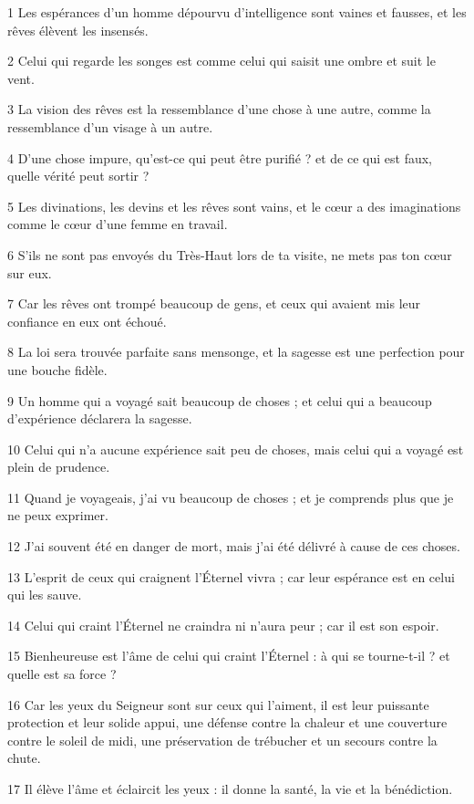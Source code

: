 
\par 1 Les espérances d'un homme dépourvu d'intelligence sont vaines et fausses, et les rêves élèvent les insensés.
\par 2 Celui qui regarde les songes est comme celui qui saisit une ombre et suit le vent.
\par 3 La vision des rêves est la ressemblance d'une chose à une autre, comme la ressemblance d'un visage à un autre.
\par 4 D'une chose impure, qu'est-ce qui peut être purifié ? et de ce qui est faux, quelle vérité peut sortir ?
\par 5 Les divinations, les devins et les rêves sont vains, et le cœur a des imaginations comme le cœur d'une femme en travail.
\par 6 S'ils ne sont pas envoyés du Très-Haut lors de ta visite, ne mets pas ton cœur sur eux.
\par 7 Car les rêves ont trompé beaucoup de gens, et ceux qui avaient mis leur confiance en eux ont échoué.
\par 8 La loi sera trouvée parfaite sans mensonge, et la sagesse est une perfection pour une bouche fidèle.
\par 9 Un homme qui a voyagé sait beaucoup de choses ; et celui qui a beaucoup d'expérience déclarera la sagesse.
\par 10 Celui qui n'a aucune expérience sait peu de choses, mais celui qui a voyagé est plein de prudence.
\par 11 Quand je voyageais, j'ai vu beaucoup de choses ; et je comprends plus que je ne peux exprimer.
\par 12 J'ai souvent été en danger de mort, mais j'ai été délivré à cause de ces choses.
\par 13 L'esprit de ceux qui craignent l'Éternel vivra ; car leur espérance est en celui qui les sauve.
\par 14 Celui qui craint l'Éternel ne craindra ni n'aura peur ; car il est son espoir.
\par 15 Bienheureuse est l'âme de celui qui craint l'Éternel : à qui se tourne-t-il ? et quelle est sa force ?
\par 16 Car les yeux du Seigneur sont sur ceux qui l'aiment, il est leur puissante protection et leur solide appui, une défense contre la chaleur et une couverture contre le soleil de midi, une préservation de trébucher et un secours contre la chute.
\par 17 Il élève l'âme et éclaircit les yeux : il donne la santé, la vie et la bénédiction.
